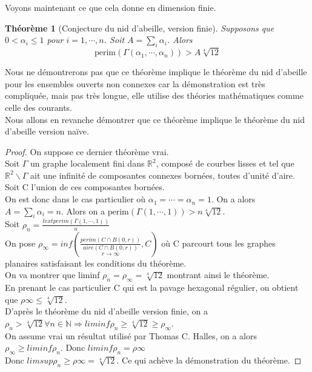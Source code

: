 \documentclass{book}
\newtheorem{theorem}{Théorème}
\newtheorem{proof}{Preuve}
\begin{document}
{\noindent Voyons maintenant ce que cela donne en dimension finie.}

\begin{tcolorbox}[colback=green!6]
\begin{theorem}[Conjecture du nid d'abeille, version finie]
Supposons que $0 < \alpha _i \leq 1$ pour $i = 1, \cdots, n$. Soit $A = \sum _i \alpha _i$. Alors
$$\text{perim}(\Gamma(\alpha_1, \cdots, \alpha_n)) > A \sqrt[4]{12}$$

\end{theorem}
\end{tcolorbox}

{\noindent Nous ne démontrerons pas que ce théorème implique le théorème du nid d'abeille pour les ensembles ouverts non connexes car la démonstration est très compliquée, mais pas très longue, elle utilise des théories mathématiques comme celle des courants.}\\
Nous allons en revanche démontrer que ce théorème implique le théorème du nid d'abeille version naïve.

\begin{proof}
On suppose ce dernier théorème vrai.\\
Soit $\Gamma$ un graphe localement fini dans $\mathbb{R}^2$, composé de courbes lisses et tel que $\mathbb{R}^2 \backslash \Gamma$ ait une infinité de composantes connexes bornées, toutes d'unité d'aire.\\
Soit C l'union de ces composantes bornées.\\
On est donc dans le cas particulier où $\alpha _1 = \cdots = \alpha _n = 1$. On a alors $A = \sum _i \alpha _i = n$. Alors on a $\text{perim} ( \Gamma(1, \cdots, 1)) > n \sqrt[4]{12}$.\\
Soit $\rho _n = \frac{text{perim} ( \Gamma(1, \cdots, 1))}{n}$\\
On pose $\rho _\infty = inf(\underset{r \rightarrow \infty}{\frac{perim(C \cap B(0,r))}{aire(C \cap B(0,r))}}, C)$ où C parcourt tous les graphes planaires satisfaisant les conditions du théorème.\\
On va montrer que liminf $ \rho _n = \rho _\infty = \sqrt[4]{12}$ montrant ainsi le théorème.\\
En prenant le cas particulier C qui est la pavage hexagonal régulier, on obtient que $\rho \infty \leq \sqrt[4]{12}$.\\
D'après le théorème du nid d'abeille version finie, on a $ \rho _n > \sqrt[4]{12} \forall n \in \mathbb{N} \Rightarrow liminf \rho _n \geq \sqrt[4]{12} \geq \rho _\infty$.\\
On assume vrai un résultat utilisé par Thomas C. Halles, on a alors $\rho _\infty \geq liminf \rho _n$.
Donc $liminf \rho _n = \rho \infty$\\
Donc $limsup \rho _n \geq \rho \infty = \sqrt[4]{12}$. Ce qui achève la démonstration du théorème.


\end{proof}
\end{document}
